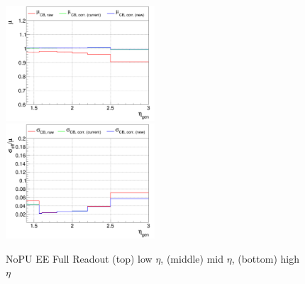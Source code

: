 \begin{figure}
\includegraphics[width=0.495\textwidth]{./plots_pdf/ECAL_plots/plotsNoPU/EE/pdf/FULL/GENETA/EEFULL_GENETA_0100_0300_MuOverBins.pdf}
\includegraphics[width=0.495\textwidth]{./plots_pdf/ECAL_plots/plotsNoPU/EE/pdf/FULL/GENETA/EEFULL_GENETA_0100_0300_EffSigmaOverBins.pdf}

\caption [Energy response of PF ECAL cluster vs $\eta$ for NoPU EE Full readout senario]{NoPU EE Full Readout (top) low $\eta$, (middle) mid $\eta$, (bottom) high $\eta$}
\label{fig:NOPU_EEFULL_eta}
\end{figure}







